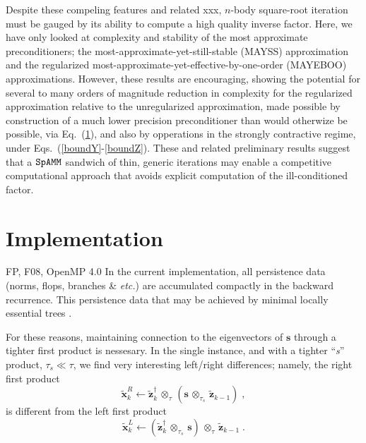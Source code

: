 \documentclass[letterpaper,twocolumn,amsmath,amsfont,amssymb,english,aps,jcp,preprintnumbers,groupaddress,nofootinbib,tightenlines,floatfix]{revtex4}
\newcommand{\mat}[1]{\boldsymbol{#1}}
\newcommand{\ot}{  {\scriptstyle \otimes}_{ \tau } }
\newcommand{\ots}{ {\scriptstyle \otimes}_{ \! \tau_s } }
\theoremstyle{plain}
\theoremstyle{remark}
\theoremstyle{plain}
\begin{document}
Despite these compeling features and related xxx, $n$-body square-root iteration must be gauged by its ability to compute 
a high quality inverse factor.   Here, we have only looked at complexity and stability of the most 
approximate preconditioners; the most-approximate-yet-still-stable (MAYSS) approximation and the regularized 
most-approximate-yet-effective-by-one-order (MAYEBOO) approximations.    However, these results are encouraging, showing 
the potential for several to many orders of magnitude reduction in complexity for the regularized approximation 
relative to the unregularized approximation, made possible by   
construction of a much lower precision preconditioner than would otherwize be possible, via Eq.~(\ref{}), 
and also by opperations in the strongly contractive regime, under Eqs.~(\ref{boundY}-\ref{boundZ}).
These and related preliminary results \cite{} suggest that a $\tt SpAMM$ sandwich of thin,
generic iterations may enable a competitive computational approach that avoids explicit computation of the 
ill-conditioned factor. 

\appendix 

\section{Implementation}


FP, F08, OpenMP 4.0
In the current implementation, all persistence data
(norms, flops, branches \& {\em etc.}) are accumulated compactly in the backward recurrence.  This persistence data
 that may be achieved by minimal locally essential trees \cite{}.



For these reasons, maintaining connection to the eigenvectors of $\mat{s}$ through 
a tighter first product is nessesary.  In the single instance, and with a 
tighter ``{\em s}'' product, $\tau_s \ll \tau$, we find very interesting left/right differences; 
namely, the right first product 
\begin{equation} 
\widetilde{\mat{x}}^R_k \leftarrow \widetilde{\mat{z}}^\dagger_{k} \, \ot  \, \left( \mat{s} \,  \ots \, \widetilde{\mat{z}}_{k-1}  \right) \; ,
\end{equation}
is  different from the left first product 
\begin{equation} 
\widetilde{\mat{x}}^L_k \leftarrow \left(  \widetilde{\mat{z}}^\dagger_{k} \, \ots \, \mat{s} \right) \,  \ot  \, \widetilde{\mat{z}}_{k-1} \; .
\end{equation}
\end{document}
